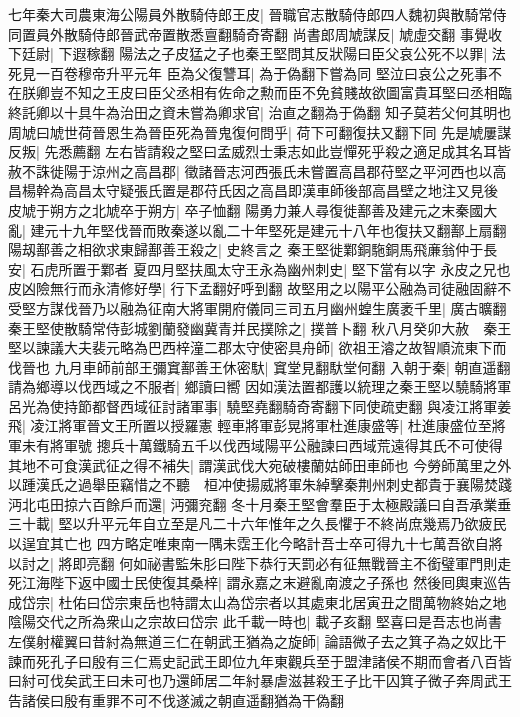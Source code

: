 七年秦大司農東海公陽員外散騎侍郎王皮|{
	晉職官志散騎侍郎四人魏初與散騎常侍同置員外散騎侍郎晉武帝置散悉亶翻騎奇寄翻}
尚書郎周虓謀反|{
	虓虛交翻}
事覺收下廷尉|{
	下遐稼翻}
陽法之子皮猛之子也秦王堅問其反狀陽曰臣父哀公死不以罪|{
	法死見一百卷穆帝升平元年}
臣為父復讐耳|{
	為于偽翻下嘗為同}
堅泣曰哀公之死事不在朕卿豈不知之王皮曰臣父丞相有佐命之勲而臣不免貧賤故欲圖富貴耳堅曰丞相臨終託卿以十具牛為治田之資未嘗為卿求官|{
	治直之翻為于偽翻}
知子莫若父何其明也周虓曰虓世荷晉恩生為晉臣死為晉鬼復何問乎|{
	荷下可翻復扶又翻下同}
先是虓屢謀反叛|{
	先悉薦翻}
左右皆請殺之堅曰孟威烈士秉志如此豈憚死乎殺之適足成其名耳皆赦不誅徙陽于涼州之高昌郡|{
	徵諸晉志河西張氏未嘗置高昌郡苻堅之平河西也以高昌楊幹為高昌太守疑張氏置是郡苻氏因之高昌即漢車師後部高昌壁之地注又見後}
皮虓于朔方之北虓卒于朔方|{
	卒子恤翻}
陽勇力兼人尋復徙鄯善及建元之末秦國大亂|{
	建元十九年堅伐晉而敗秦遂以亂二十年堅死是建元十八年也復扶又翻鄯上扇翻}
陽刼鄯善之相欲求東歸鄯善王殺之|{
	史終言之}
秦王堅徙鄴銅駞銅馬飛亷翁仲于長安|{
	石虎所置于鄴者}
夏四月堅扶風太守王永為幽州刺史|{
	堅下當有以字}
永皮之兄也皮凶險無行而永清修好學|{
	行下孟翻好呼到翻}
故堅用之以陽平公融為司徒融固辭不受堅方謀伐晉乃以融為征南大將軍開府儀同三司五月幽州蝗生廣袤千里|{
	廣古曠翻}
秦王堅使散騎常侍彭城劉蘭發幽冀青并民撲除之|{
	撲普卜翻}
秋八月癸卯大赦　秦王堅以諫議大夫裴元略為巴西梓潼二郡太守使密具舟師|{
	欲祖王濬之故智順流東下而伐晉也}
九月車師前部王彌窴鄯善王休密馱|{
	窴堂見翻馱堂何翻}
入朝于秦|{
	朝直遥翻}
請為鄉導以伐西域之不服者|{
	鄉讀曰嚮}
因如漢法置都護以統理之秦王堅以驍騎將軍呂光為使持節都督西域征討諸軍事|{
	驍堅堯翻騎奇寄翻下同使疏吏翻}
與凌江將軍姜飛|{
	凌江將軍晉文王所置以授羅憲}
輕車將軍彭晃將軍杜進康盛等|{
	杜進康盛位至將軍未有將軍號}
摠兵十萬鐵騎五千以伐西域陽平公融諫曰西域荒遠得其氏不可使得其地不可食漢武征之得不補失|{
	謂漢武伐大宛破樓蘭姑師田車師也}
今勞師萬里之外以踵漢氏之過舉臣竊惜之不聽　桓冲使揚威將軍朱綽擊秦荆州刺史都貴于襄陽焚踐沔北屯田掠六百餘戶而還|{
	沔彌兖翻}
冬十月秦王堅會羣臣于太極殿議曰自吾承業垂三十載|{
	堅以升平元年自立至是凡二十六年惟年之久長懼于不終尚庶幾焉乃欲疲民以逞宜其亡也}
四方略定唯東南一隅未霑王化今略計吾士卒可得九十七萬吾欲自將以討之|{
	將即亮翻}
何如祕書監朱肜曰陛下恭行天罰必有征無戰晉主不銜璧軍門則走死江海陛下返中國士民使復其桑梓|{
	謂永嘉之末避亂南渡之子孫也}
然後囘輿東巡告成岱宗|{
	杜佑曰岱宗東岳也特謂太山為岱宗者以其處東北居寅丑之間萬物終始之地陰陽交代之所為衆山之宗故曰岱宗}
此千載一時也|{
	載子亥翻}
堅喜曰是吾志也尚書左僕射權翼曰昔紂為無道三仁在朝武王猶為之旋師|{
	論語微子去之箕子為之奴比干諫而死孔子曰殷有三仁焉史記武王即位九年東觀兵至于盟津諸侯不期而會者八百皆曰紂可伐矣武王曰未可也乃還師居二年紂暴虐滋甚殺王子比干囚箕子微子奔周武王告諸侯曰殷有重罪不可不伐遂滅之朝直遥翻猶為干偽翻}
